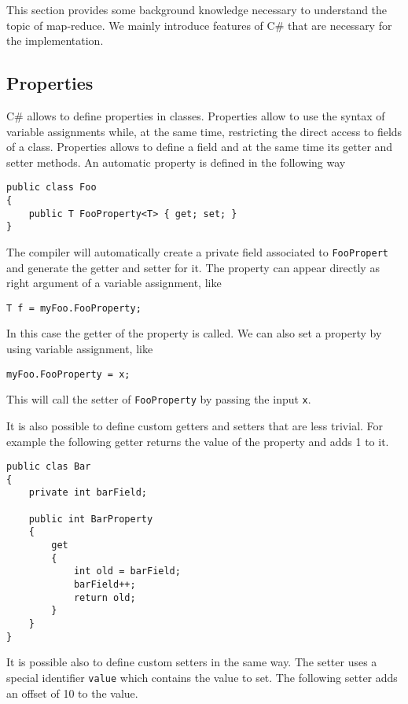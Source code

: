 This section provides some background knowledge necessary to understand the topic of map-reduce. We mainly introduce features of C\# that are necessary for the implementation.

\subsection{Properties}
C\# allows to define properties in classes. Properties allow to use the syntax of variable assignments while, at the same time, restricting the direct access to fields of a class. Properties allows to define a field and at the same time its getter and setter methods. An automatic property is defined in the following way

\begin{lstlisting}
public class Foo
{
	public T FooProperty<T> { get; set; }
}
\end{lstlisting}

\noindent
The compiler will automatically create a private field associated to \texttt{FooPropert} and generate the getter and setter for it. The property can appear directly as right argument of a variable assignment, like

\begin{lstlisting}
T f = myFoo.FooProperty;
\end{lstlisting}

\noindent
In this case the getter of the property is called. We can also set a property by using variable assignment, like

\begin{lstlisting}
myFoo.FooProperty = x;
\end{lstlisting}

\noindent
This will call the setter of \texttt{FooProperty} by passing the input \texttt{x}.

It is also possible to define custom getters and setters that are less trivial. For example the following getter returns the value of the property and adds 1 to it.

\begin{lstlisting}
public clas Bar
{
	private int barField;
	
	public int BarProperty
	{
		get
		{
			int old = barField;
			barField++;
			return old;
		}
	}
}
\end{lstlisting}

\noindent
It is possible also to define custom setters in the same way. The setter uses a special identifier \texttt{value} which contains the value to set. The following setter adds an offset of 10 to the value. 


